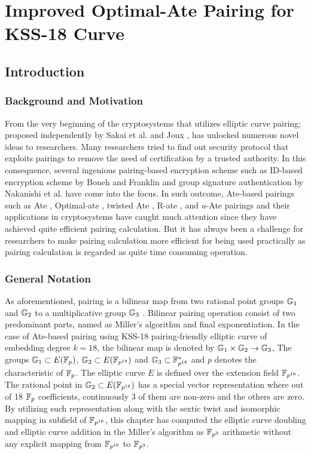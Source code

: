 \chapter{Improved Optimal-Ate Pairing for KSS-18 Curve} 
\label{ch:optate_kss18_icisc2016}

\section{Introduction}
\label{ch:icisc2016:intro}

\subsection{Background and Motivation}
\label{sec:ch:icisc:bac_motivation}
From the very beginning of the cryptosystems that utilizes elliptic curve pairing; proposed independently by Sakai et al. \cite{EPRINT:SakKas03} and Joux \cite{JC:Joux04}, has unlocked numerous novel ideas to researchers. 
Many researchers tried to find out security protocol that exploits pairings to remove the need of certification by a trusted authority. 
In this consequence, several ingenious pairing-based encryption scheme such as ID-based encryption scheme by  Boneh and Franklin \cite{C:BonFra01} and group signature authentication by Nakanishi et al. \cite{AC:NakFun05} have come into the focus. 
In such outcome, Ate-based pairings such as Ate \cite{DBLP:reference/crc/2005ehcc}, Optimal-ate \cite{DBLP:journals/tit/Vercauteren10}, twisted Ate \cite{EPRINT:MKHO07},  R-ate \cite{r_ate}, and $u$-Ate \cite{PAIRING:NASKM08} pairings and their applications in cryptosystems have caught much attention since they have achieved quite efficient pairing calculation.
But it has always been a challenge for researchers to make pairing calculation more efficient for being used practically as pairing calculation is regarded as quite time consuming operation. 

\subsection{General Notation}
\label{sec:ch:icisc:notation}
As aforementioned, pairing is a bilinear map from two rational point groups ${\mathbb{G}}_{1}$ and ${\mathbb{G}}_{2}$ to a multiplicative group ${\mathbb{G}}_{3}$ \cite{Silverman}.
Bilinear pairing operation consist of two predominant parts,  named as Miller's algorithm and final exponentiation.
In  the case of  Ate-based pairing using KSS-18 pairing-friendly elliptic curve of embedding degree $k=18$,  the bilinear map is denoted by ${\mathbb{G}}_{1} \times {\mathbb{G}}_{2} \rightarrow {\mathbb{G}}_{3}$,
The groups ${\mathbb{G}}_{1} \subset E(\mathbb{F}_p)$, ${\mathbb{G}}_{2} \subset E(\mathbb{F}_{p^{18}})$ and ${\mathbb{G}}_{3}  \subset \mathbb{F}^*_{p^{18}}$ and  $p$ denotes the characteristic of ${\mathbb{F}}_{p}$.
 The elliptic curve $E$ is defined over the extension field $\mathbb{F}_{p^{18}}$. 
The rational point in ${\mathbb{G}}_{2} \subset E(\mathbb{F}_{p^{18}})$ has  a special vector representation where out of 18 ${\mathbb{F}}_{p}$ coefficients, continuously 3 of them are non-zero and the others are zero. 
By utilizing such representation along with the sextic twist and isomorphic mapping in subfield of $\mathbb{F}_{p^{18}}$, this chapter has computed the elliptic curve doubling and elliptic curve addition in the Miller's algorithm as $\mathbb{F}_{p^3}$ arithmetic without any explicit mapping from $\mathbb{F}_{p^{18}}$ to $\mathbb{F}_{p^3}$.

